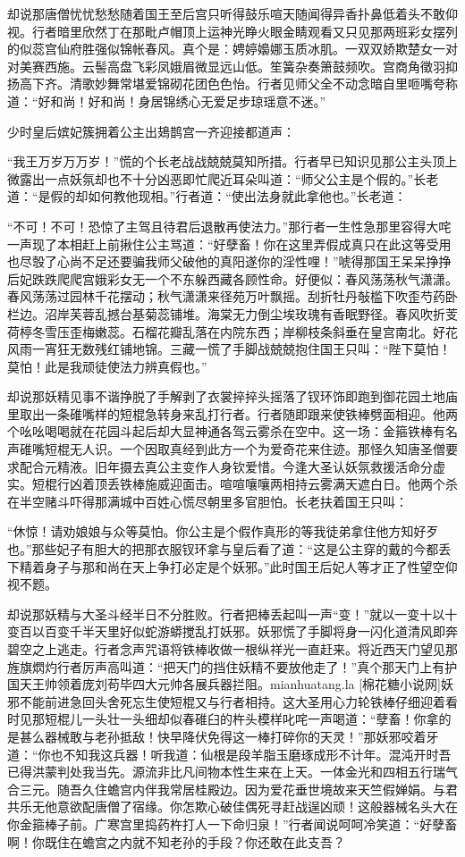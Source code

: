 \documentclass[12pt,UTF8]{ctexbook}
\begin{document}
{	却说那唐僧忧忧愁愁随着国王至后宫只听得鼓乐喧天随闻得异香扑鼻低着头不敢仰视。行者暗里欣然丁在那毗卢帽顶上运神光睁火眼金睛观看又只见那两班彩女摆列的似蕊宫仙府胜强似锦帐春风。真个是：娉婷嬝娜玉质冰肌。一双双娇欺楚女一对对美赛西施。云髻高盘飞彩凤娥眉微显远山低。笙簧杂奏箫鼓频吹。宫商角徵羽抑扬高下齐。清歌妙舞常堪爱锦砌花团色色怡。行者见师父全不动念暗自里咂嘴夸称道：“好和尚！好和尚！身居锦绣心无爱足步琼瑶意不迷。”
	
	少时皇后嫔妃簇拥着公主出鳷鹊宫一齐迎接都道声：
	
	“我王万岁万万岁！”慌的个长老战战兢兢莫知所措。行者早已知识见那公主头顶上微露出一点妖氛却也不十分凶恶即忙爬近耳朵叫道：“师父公主是个假的。”长老道：“是假的却如何教他现相。”行者道：“使出法身就此拿他也。”长老道：
	
	“不可！不可！恐惊了主驾且待君后退散再使法力。”那行者一生性急那里容得大咤一声现了本相赶上前揪住公主骂道：“好孽畜！你在这里弄假成真只在此这等受用也尽彀了心尚不足还要骗我师父破他的真阳遂你的淫性哩！”唬得那国王呆呆挣挣后妃跌跌爬爬宫娥彩女无一个不东躲西藏各顾性命。好便似：春风荡荡秋气潇潇。春风荡荡过园林千花摆动；秋气潇潇来径苑万叶飘摇。刮折牡丹敧槛下吹歪芍药卧栏边。沼岸芙蓉乱撼台基菊蕊铺堆。海棠无力倒尘埃玫瑰有香眠野径。春风吹折芰荷楟冬雪压歪梅嫩蕊。石榴花瓣乱落在内院东西；岸柳枝条斜垂在皇宫南北。好花风雨一宵狂无数残红铺地锦。三藏一慌了手脚战兢兢抱住国王只叫：“陛下莫怕！莫怕！此是我顽徒使法力辨真假也。”
	
	却说那妖精见事不谐挣脱了手解剥了衣裳捽捽头摇落了钗环饰即跑到御花园土地庙里取出一条碓嘴样的短棍急转身来乱打行者。行者随即跟来使铁棒劈面相迎。他两个吆吆喝喝就在花园斗起后却大显神通各驾云雾杀在空中。这一场：金箍铁棒有名声碓嘴短棍无人识。一个因取真经到此方一个为爱奇花来住迹。那怪久知唐圣僧要求配合元精液。旧年摄去真公主变作人身钦爱惜。今逢大圣认妖氛救援活命分虚实。短棍行凶着顶丢铁棒施威迎面击。喧喧嚷嚷两相持云雾满天遮白日。他两个杀在半空赌斗吓得那满城中百姓心慌尽朝里多官胆怕。长老扶着国王只叫：
	
	“休惊！请劝娘娘与众等莫怕。你公主是个假作真形的等我徒弟拿住他方知好歹也。”那些妃子有胆大的把那衣服钗环拿与皇后看了道：“这是公主穿的戴的今都丢下精着身子与那和尚在天上争打必定是个妖邪。”此时国王后妃人等才正了性望空仰视不题。
	
	却说那妖精与大圣斗经半日不分胜败。行者把棒丢起叫一声“变！”就以一变十以十变百以百变千半天里好似蛇游蟒搅乱打妖邪。妖邪慌了手脚将身一闪化道清风即奔碧空之上逃走。行者念声咒语将铁棒收做一根纵祥光一直赶来。将近西天门望见那旌旗熌灼行者厉声高叫道：“把天门的挡住妖精不要放他走了！”真个那天门上有护国天王帅领着庞刘苟毕四大元帅各展兵器拦阻。mianhuatang.la [棉花糖小说网]妖邪不能前进急回头舍死忘生使短棍又与行者相持。这大圣用心力轮铁棒仔细迎着看时见那短棍儿一头壮一头细却似春碓臼的杵头模样叱咤一声喝道：“孽畜！你拿的是甚么器械敢与老孙抵敌！快早降伏免得这一棒打碎你的天灵！”那妖邪咬着牙道：“你也不知我这兵器！听我道：仙根是段羊脂玉磨琢成形不计年。混沌开时吾已得洪蒙判处我当先。源流非比凡间物本性生来在上天。一体金光和四相五行瑞气合三元。随吾久住蟾宫内伴我常居桂殿边。因为爱花垂世境故来天竺假婵娟。与君共乐无他意欲配唐僧了宿缘。你怎欺心破佳偶死寻赶战逞凶顽！这般器械名头大在你金箍棒子前。广寒宫里捣药杵打人一下命归泉！”行者闻说呵呵冷笑道：“好孽畜啊！你既住在蟾宫之内就不知老孙的手段？你还敢在此支吾？
	
}
\end{document}
